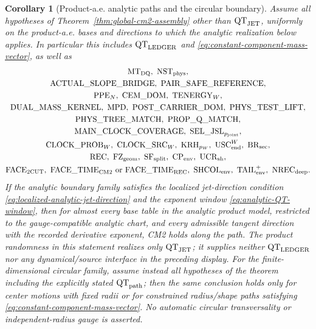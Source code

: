 \documentclass[11pt]{article}
\newtheorem{corollary}[theorem]{Corollary}
\begin{document}
\begin{corollary}[Product-a.e. analytic paths and the circular boundary]
\label{cor:analytic-pathwise-CM2}
Assume all hypotheses of Theorem~\ref{thm:global-cm2-assembly} other than
$\mathrm{QT}_{\rm JET}$, uniformly on the product-a.e. bases and directions
to which the analytic realization below applies.  In
particular this includes $\mathrm{QT}_{\rm LEDGER}$ and
\eqref{eq:constant-component-mass-vector}, as well as
\[
\begin{gathered}
 \mathrm{MT}_{\rm DQ},\ \mathrm{NST}_{\rm phys},\\
 \mathrm{ACTUAL\_SLOPE\_BRIDGE},\ \mathrm{PAIR\_SAFE\_REFERENCE},\\
 \mathrm{PPE}_{N},\ \mathrm{CEM\_DOM},\ \mathrm{TENERGY}_{W},\\
 \mathrm{DUAL\_MASS\_KERNEL},\ \mathrm{MPD},\
 \mathrm{POST\_CARRIER\_DOM},\ \mathrm{PHYS\_TEST\_LIFT},\\
 \mathrm{PHYS\_TREE\_MATCH},\ \mathrm{PROP\_Q\_MATCH},\\
 \mathrm{MAIN\_CLOCK\_COVERAGE},\
 \mathrm{SEL\_JSL}_{p_{\rm joint}},\\
 \mathrm{CLOCK\_PROB}_{W},\ \mathrm{CLOCK\_SRC}_{W},\
 \mathrm{KRH}_{p_W},\ \mathrm{USC}_{\rm end}^{W},\ \mathrm{BR}_{\rm sec},\\
 \mathrm{REC},\ \mathrm{FZ}_{\rm geom},\ \mathrm{SF}_{\rm split},\
 \mathrm{CP}_{\rm env},\ \mathrm{UCR}_{\rm sh},\\
 \mathrm{FACE}_{\rm 2CUT},\
 \mathrm{FACE\_TIME}_{\rm CM2}\text{ or }\mathrm{FACE\_TIME}_{\rm REC},\
 \mathrm{SHCOL}_{\rm env},\
 \mathrm{TAIL}_{\rm env}^{+},\ \mathrm{NREC}_{\rm deep}.
\end{gathered}
\]
If the analytic boundary family
satisfies the localized jet-direction condition
\eqref{eq:localized-analytic-jet-direction} and the exponent window
\eqref{eq:analytic-QT-window}, then for almost every base table in the
analytic product model, restricted to the gauge-compatible analytic chart,
and every admissible tangent direction with the
recorded derivative exponent, CM2 holds along the path.
The product randomness in this statement realizes only
$\mathrm{QT}_{\rm JET}$; it supplies neither
$\mathrm{QT}_{\rm LEDGER}$ nor any dynamical/source interface in the
preceding display.
For the finite-dimensional circular family, assume instead all hypotheses
of the theorem including the explicitly stated $\mathrm{QT}_{\rm path}$;
then the same conclusion holds only for center motions with fixed radii or
for constrained radius/shape paths satisfying
\eqref{eq:constant-component-mass-vector}.  No automatic circular
transversality or independent-radius gauge is asserted.
\end{corollary}
\end{document}
